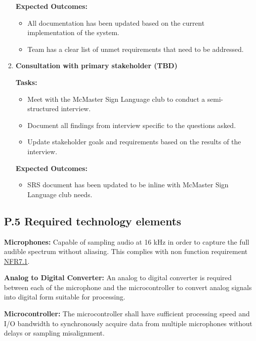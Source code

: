 \documentclass[12pt]{article}
\theoremstyle{definition}
\begin{document}
\begin{enumerate}
  \textbf{Expected Outcomes:}
  \begin{itemize}
      \item All documentation has been updated based on the current
      implementation of the system. 
      \item Team has a clear list of unmet requirements that need to be
      addressed. 
  \end{itemize}

  \vspace{0.8em}
  
  \item \textbf{Consultation with primary stakeholder (TBD)}    

  \textbf{Tasks:}
  \begin{itemize}
      \item Meet with the McMaster Sign Language club to conduct a
      semi-structured interview.
      \item Document all findings from interview specific to the questions
      asked. 
      \item Update stakeholder goals and requirements based on the results of
      the interview. 
  \end{itemize}

  \textbf{Expected Outcomes:}
  \begin{itemize}
      \item SRS document has been updated to be inline with McMaster Sign
      Language club needs. 
  \end{itemize}

  \vspace{0.8em}

\end{enumerate}


\subsection{P.5 Required technology elements}

\textbf{Microphones:}
Capable of sampling audio at 16 kHz in order to capture the full audible
spectrum without aliasing. This complies with non function requirement
\hyperref[NFR7_1]{NFR7.1}.
  
\textbf{Analog to Digital Converter:}
An analog to digital converter is required between each of the microphone and
the microcontroller to convert analog signals into digital form suitable for
processing.
  
\textbf{Microcontroller:} 
The microcontroller shall have sufficient processing speed and I/O bandwidth to
synchronously acquire data from multiple microphones without delays or sampling
misalignment.
\end{document}
